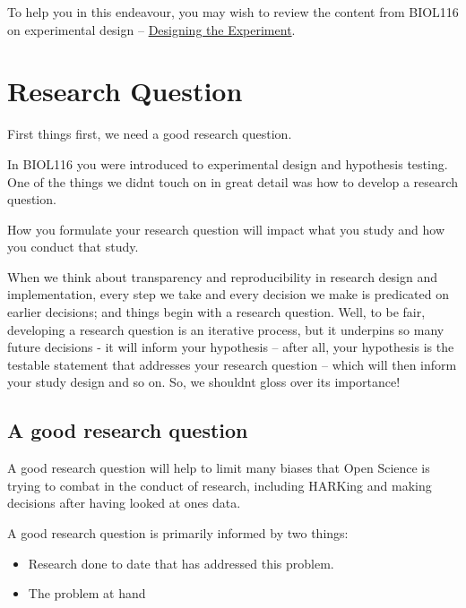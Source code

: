 \documentclass[
]{book}
\providecommand{\tightlist}{%
  \setlength{\itemsep}{0pt}\setlength{\parskip}{0pt}}
\begin{document}
To help you in this endeavour, you may wish to review the content from BIOL116 on experimental design -- \href{https://ubco-biology.github.io/BIOL-116-Lab-Manual/designing-the-experiment.html}{Designing the Experiment}.

\hypertarget{research-question}{%
\chapter*{Research Question}\label{research-question}}

First things first, we need a good research question.

In BIOL116 you were introduced to experimental design and hypothesis testing. One of the things we didn\textquotesingle t touch on in great detail was how to develop a research question.

How you formulate your research question will impact what you study and how you conduct that study.

When we think about transparency and reproducibility in research design and implementation, every step we take and every decision we make is predicated on earlier decisions; and things begin with a research question. Well, to be fair, developing a research question is an iterative process, but it underpins so many future decisions - it will inform your hypothesis -- after all, your hypothesis is the testable statement that addresses your research question -- which will then inform your study design and so on. So, we shouldn\textquotesingle t gloss over it\textquotesingle s importance!

\hypertarget{a-good-research-question}{%
\section*{A good research question}\label{a-good-research-question}}

A good research question will help to limit many biases that Open Science is trying to combat in the conduct of research, including HARKing and making decisions after having looked at one\textquotesingle s data.

A good research question is primarily informed by two things:

\begin{itemize}
\tightlist
\item
  Research done to date that has addressed this problem.
\item
  The problem at hand
\end{itemize}
\end{document}
